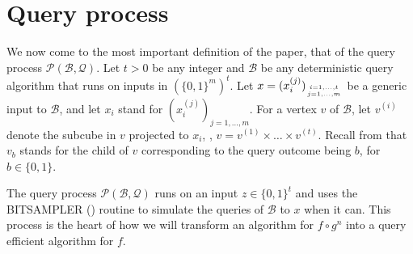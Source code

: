 \documentclass{toc}
\newcommand{\clB}{\mathcal{B}}
\newcommand{\clQ}{\mathcal{Q}}
\newcommand{\clP}{\mathcal{P}}
\begin{document}
\section{Query process}
\label{cc}
We now come to the most important definition of the paper, that of the query process $\clP(\clB, \clQ)$.
Let $t>0$ be any integer and $\clB$ be any deterministic query algorithm that runs on inputs in $\left(\{0,1\}^m\right)^t$. Let $x=(x_i^{(j)})_{{i=1, \ldots, t} \atop {j=1, \ldots, m}}$ be a generic input to $\clB$, and let $x_i$ stand for $(x_i^{(j)})_{j=1, \ldots, m}$. 
For a vertex $v$ of $\clB$, let $v^{(i)}$ denote the subcube in $v$ projected to $x_i$, \ie, $v=v^{(1)} \times \ldots \times v^{(t)}$. Recall from  that $v_b$ stands for the child of $v$ corresponding to the query 
outcome being $b$, for $b \in \{0,1\}$.  

The query process $\clP(\clB, \clQ)$ runs on an input $z \in \{0,1\}^t$ and uses the BITSAMPLER () routine to simulate the queries of $\clB$ to $x$ when it can.  This process is the heart of how we will transform an 
algorithm for $f \circ g^n$ into a query efficient algorithm for $f$. 
\end{document}
